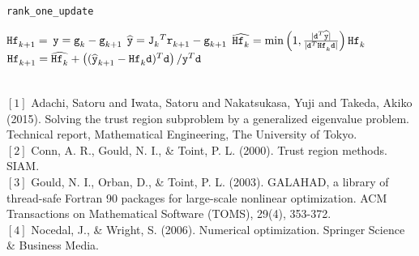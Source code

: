 \begin{algorithm}
\caption{{\tt rank\_one\_update}}
\label{alg:rank_one_update}
  \begin{algorithmic}
     $\iter[k+1]{\thess} = $ 
    \State $\ty = \iter[k]{\tg} - \iter[k+1]{\tg}$ \State
    $\widehat{\ty} = {\iter[k]{\tJ}}^T \iter[k+1]{\tr} -
    \iter[k+1]{\tg}$ \State $\widehat{\iter[k]{\thess}} = \min\left(
      1, \frac{|\td^T\widehat{\ty}|}{|\td^T\iter[k]{\thess}\td|}\right)
    \iter[k]{\thess}$ \State $\iter[k+1]{\thess} =
    \widehat{\iter[k]{\thess}} + \left(({\iter[k+1]{\widehat{\ty}}} -
      \iter[k]{\thess}\td )^T\td\right)/\ty^T\td$

  \end{algorithmic}
\end{algorithm}

\hslreferences\\
$[1]$ Adachi, Satoru and Iwata, Satoru and Nakatsukasa, Yuji and Takeda, Akiko (2015).
Solving the trust region subproblem by a generalized eigenvalue problem.
Technical report, Mathematical Engineering, The University of Tokyo.\\
$[2]$ Conn, A. R., Gould, N. I., \& Toint, P. L. (2000). Trust region methods. SIAM.\\
$[3]$ Gould, N. I., Orban, D., \& Toint, P. L. (2003). GALAHAD, a library of thread-safe Fortran 90 packages for large-scale nonlinear optimization. ACM Transactions on Mathematical Software (TOMS), 29(4), 353-372.\\
$[4]$ Nocedal, J., \& Wright, S. (2006). Numerical optimization. Springer Science \& Business Media.

